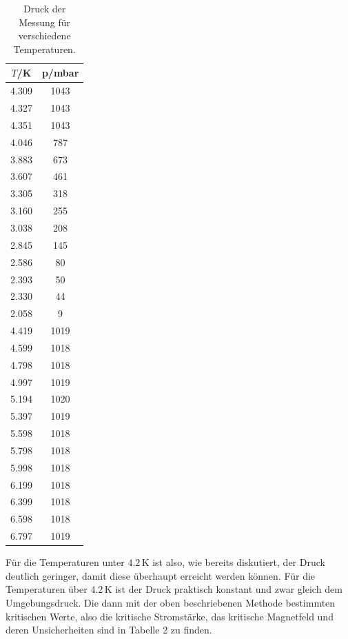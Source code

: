 \documentclass[german,  %
parskip=full,  %
]{scrartcl}
\begin{document}
\begin{table} \centering
\begin{tabular}{|c|c|}
\hline
\(T\)/K & p/mbar \\\hline
4.309 & 1043\\\hline
4.327 & 1043\\\hline
4.351 & 1043\\\hline
4.046 & 787\\\hline
3.883 & 673\\\hline
3.607 & 461\\\hline
3.305 & 318\\\hline
3.160 & 255\\\hline
3.038 & 208\\\hline
2.845 & 145\\\hline
2.586 & 80\\\hline
2.393 & 50\\\hline
2.330 & 44\\\hline
2.058 & 9\\\hline
4.419 & 1019\\\hline
4.599 & 1018\\\hline
4.798 & 1018\\\hline
4.997 & 1019\\\hline
5.194 & 1020\\\hline
5.397 & 1019\\\hline
5.598 & 1018\\\hline
5.798 & 1018\\\hline
5.998 & 1018\\\hline
6.199 & 1018\\\hline
6.399 & 1018\\\hline
6.598 & 1018\\\hline
6.797 & 1019\\\hline
\end{tabular}
\caption{Druck der Messung für verschiedene Temperaturen.}
\label{tab1}
\end{table}
Für die Temperaturen unter $4.2$\,K ist also, wie bereits diskutiert, der Druck deutlich geringer, damit diese überhaupt erreicht werden können. Für die Temperaturen über $4.2$\,K ist der Druck praktisch konstant und zwar gleich dem Umgebungsdruck.
\newpage
Die dann mit der oben beschriebenen Methode bestimmten kritischen Werte, also die kritische Stromstärke, das kritische Magnetfeld und deren Unsicherheiten sind in Tabelle 2 zu finden.
\\
\end{document}
